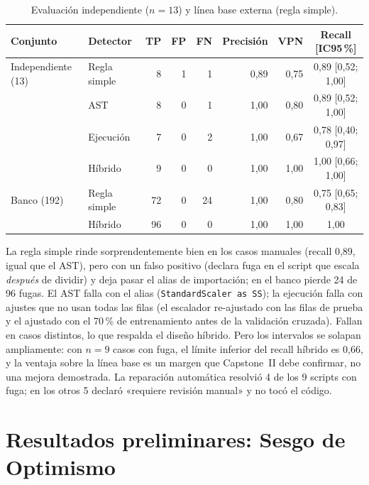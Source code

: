 \begin{table}[!htbp]
\centering
\caption{Evaluación independiente ($n=13$) y línea base externa (regla simple).}
\label{tab:indep}
\label{tab:base}
\begingroup\footnotesize\singlespacing
\begin{tabular}{@{}l l r r r r r c@{}}
\toprule
Conjunto & Detector & TP & FP & FN & Precisión & VPN & Recall [IC95\,\%] \\
\midrule
Independiente (13) & Regla simple & 8 & 1 & 1 & 0,89 & 0,75 & 0,89 [0,52; 1,00] \\
 & AST & 8 & 0 & 1 & 1,00 & 0,80 & 0,89 [0,52; 1,00] \\
 & Ejecución & 7 & 0 & 2 & 1,00 & 0,67 & 0,78 [0,40; 0,97] \\
 & Híbrido & 9 & 0 & 0 & 1,00 & 1,00 & 1,00 [0,66; 1,00] \\
\midrule
Banco (192) & Regla simple & 72 & 0 & 24 & 1,00 & 0,80 & 0,75 [0,65; 0,83] \\
 & Híbrido & 96 & 0 & 0 & 1,00 & 1,00 & 1,00 \\
\bottomrule
\end{tabular}
\endgroup
\end{table}

La regla simple rinde sorprendentemente bien en los casos manuales (recall 0,89, igual que el AST), pero con un falso positivo (declara fuga en el script que escala \emph{después} de dividir) y deja pasar el alias de importación; en el banco pierde 24 de 96 fugas. El AST falla con el alias (\texttt{StandardScaler as SS}); la ejecución falla con ajustes que no usan todas las filas (el escalador re-ajustado con las filas de prueba y el ajustado con el 70\,\% de entrenamiento antes de la validación cruzada). Fallan en casos distintos, lo que respalda el diseño híbrido. Pero los intervalos se solapan ampliamente: con $n=9$ casos con fuga, el límite inferior del recall híbrido es 0,66, y la ventaja sobre la línea base es un margen que Capstone~II debe confirmar, no una mejora demostrada. La reparación automática resolvió 4 de los 9 scripts con fuga; en los otros 5 declaró «requiere revisión manual» y no tocó el código.

\section{Resultados preliminares: Sesgo de Optimismo}
\label{sec:dopt}

